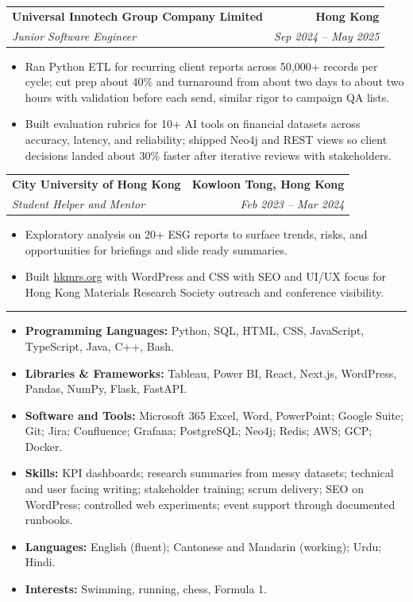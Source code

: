 \documentclass[10pt,a4paper]{article}
\makeatletter
\newcommand{\ressection}[1]{%
  \vspace{0.8em}%
  \noindent{\large\scshape\bfseries #1}\par\nobreak
  \vspace{-\parskip}%
  \noindent\rule{\linewidth}{0.1pt}\par\nobreak
  \vspace{-\parskip}%
}
\newcommand{\resumeSubheading}[4]{%
  \vspace{0.6em}%
  \begin{tabular*}{\textwidth}{l@{\extracolsep{\fill}}r}
    \textbf{#1} & \textbf{#2} \\
    \textit{\small #3} & \textit{\small #4} \\
  \end{tabular*}\vspace{0.32em}}
\makeatother
\begin{document}
\resumeSubheading{Universal Innotech Group Company Limited}{Hong Kong}{Junior Software Engineer}{Sep 2024 -- May 2025}
\begin{itemize}
  \item Ran Python ETL for recurring client reports across 50{,}000+ records per cycle; cut prep about 40\% and turnaround from about two days to about two hours with validation before each send, similar rigor to campaign QA lists.
  \item Built evaluation rubrics for 10+ AI tools on financial datasets across accuracy, latency, and reliability; shipped Neo4j and REST views so client decisions landed about 30\% faster after iterative reviews with stakeholders.
\end{itemize}

\resumeSubheading{City University of Hong Kong}{Kowloon Tong, Hong Kong}{Student Helper and Mentor}{Feb 2023 -- Mar 2024}
\begin{itemize}
  \item Exploratory analysis on 20+ ESG reports to surface trends, risks, and opportunities for briefings and slide ready summaries.
  \item Built \href{https://hkmrs.org}{hkmrs.org} with WordPress and CSS with SEO and UI/UX focus for Hong Kong Materials Research Society outreach and conference visibility.
\end{itemize}

\ressection{Skills and Interests}
\begin{itemize}
  \item \textbf{Programming Languages:} Python, SQL, HTML, CSS, JavaScript, TypeScript, Java, C++, Bash.
  \item \textbf{Libraries \& Frameworks:} Tableau, Power BI, React, Next.js, WordPress, Pandas, NumPy, Flask, FastAPI.
  \item \textbf{Software and Tools:} Microsoft 365 Excel, Word, PowerPoint; Google Suite; Git; Jira; Confluence; Grafana; PostgreSQL; Neo4j; Redis; AWS; GCP; Docker.
  \item \textbf{Skills:} KPI dashboards; research summaries from messy datasets; technical and user facing writing; stakeholder training; scrum delivery; SEO on WordPress; controlled web experiments; event support through documented runbooks.
  \item \textbf{Languages:} English (fluent); Cantonese and Mandarin (working); Urdu; Hindi.
  \item \textbf{Interests:} Swimming, running, chess, Formula 1.
\end{itemize}
\end{document}
